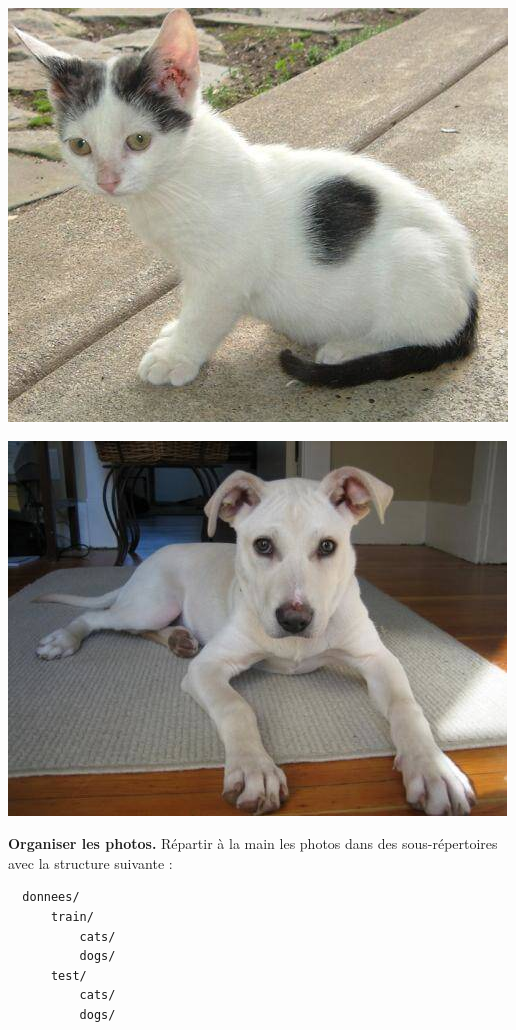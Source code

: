 \documentclass[11pt,class=report,crop=false]{standalone}
\begin{document}
\begin{center}
\begin{minipage}{0.45\textwidth}
\includegraphics[scale=\myscale,scale=0.3]{figures/cat_3}
\end{minipage}
\begin{minipage}{0.45\textwidth}
\includegraphics[scale=\myscale,scale=0.34]{figures/dog_87}
\end{minipage}
\end{center}

\textbf{Organiser les photos.}
Répartir à la main les photos dans des sous-répertoires avec la structure suivante :
\begin{lstlisting}
  donnees/
      train/
          cats/
          dogs/
      test/
          cats/
          dogs/
\end{lstlisting}
\end{document}
